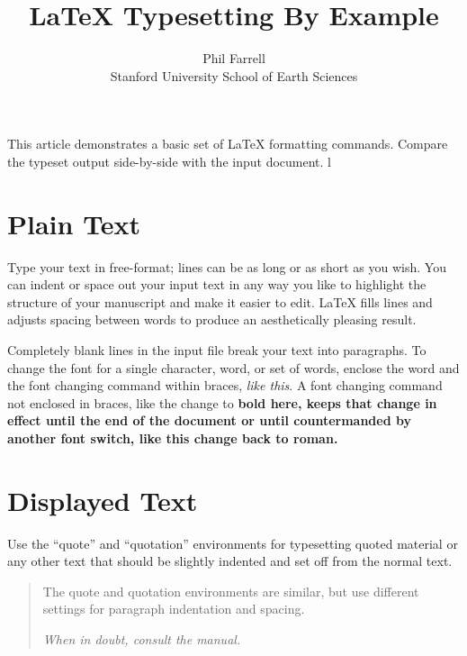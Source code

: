 \setlength{\topmargin}{-.5in}
\setlength{\textheight}{9in}
\setlength{\oddsidemargin}{.125in}
\setlength{\textwidth}{6.25in}

\title{LaTeX Typesetting By Example}
\author{Phil Farrell\\
Stanford University School of Earth Sciences}
\renewcommand{\today}{November 2, 1994}
\maketitle
This article demonstrates a basic set of LaTeX formatting commands.
Compare the typeset output side-by-side with the input document. l

\section {Plain Text}
Type your text in free-format; lines can be as long
or as short
as you wish.
      You can indent      or space out
        your input
          text in
            any way you like to highlight the structure
      of your manuscript and make it easier to edit.
LaTeX fills lines and adjusts spacing between words to produce an
aesthetically pleasing result.

Completely blank lines in the input file break your text into
paragraphs.
To change the font for a single character, word, or set of words,
enclose the word and the font changing command within braces,
{\em like this}.
A font changing command not enclosed in braces, like the change to \bf
bold here, keeps that change in effect until the end of the document or
until countermanded by another font switch, like this change back to
\rm roman. 

\section {Displayed Text}
Use the ``quote'' and ``quotation'' environments for typesetting quoted
material or any other text that should be slightly indented and set off
from the normal text.
\begin{quotation}
The quote and quotation environments are similar, but use different
settings for paragraph indentation and spacing.

\em When in doubt, consult the manual.
\end{quotation}

